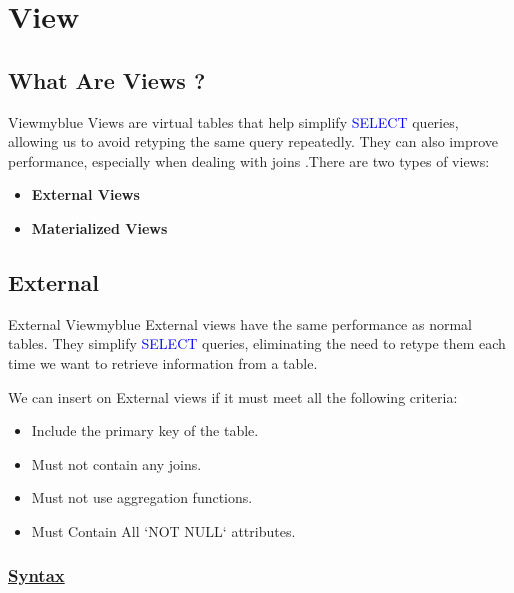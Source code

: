 \section{View}
\subsection{What Are Views ?}



\begin{prettyBox}{View}{myblue}
    Views are virtual tables that help simplify \textcolor{blue}{SELECT} queries, allowing us to avoid retyping the same query repeatedly. They can also improve performance, especially when dealing with joins .There are two types of views:  
\begin{itemize}
    \item \textbf{External Views} 
    \item \textbf{Materialized Views}
\end{itemize}
\end{prettyBox}




\subsection{External}


\begin{prettyBox}{External View}{myblue}
    External views have the same performance as normal tables. They simplify \textcolor{blue}{SELECT} queries, eliminating the need to retype them each time we want to retrieve information from a table. 

\vspace{0.15cm}
We can insert on External views if it must meet all the following criteria:  
\begin{itemize}
    \item Include the primary key of the table.
    \item Must not contain any joins.
    \item Must not use aggregation functions.
    \item Must Contain All `NOT NULL` attributes.
\end{itemize}
\end{prettyBox}


\subsubsection*{\underline{Syntax}}

